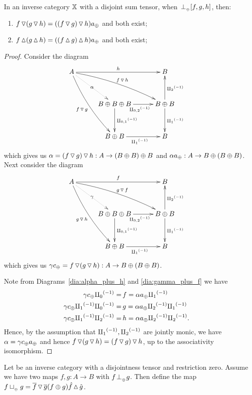 \begin{lemma}\label{lem:tjdown_and_tjup_associate}
  In an inverse category $\mathbb{X}$ with a disjoint sum tensor, when ${}_{{}_{}}{\perp_{{}_{\oplus}}} [f,g,h]$, then:
  \begin{enumerate}
    \item   $f \operatorname{\triangledown} (g \operatorname{\triangledown} h) = ((f \operatorname{\triangledown} g) \operatorname{\triangledown} h) a_{\oplus}$ and both exist;
    \item   $f \operatorname{\vartriangle} (g \operatorname{\vartriangle} h) = ((f \operatorname{\vartriangle} g) \operatorname{\vartriangle} h) a_{\oplus}$ and both exist;
  \end{enumerate}
\end{lemma}
\begin{proof}
  Consider the diagram
  \begin{equation}
    \xymatrix@C+5pt@R+10pt{
      A \ar@/_/[ddr]_{f\tjdown g} \ar@/^/[drr]^{f\tjdown h} \ar@{.>}[dr]|-{\alpha} \ar[rr]^{h}
        & & B \\
        & B\+B\+B \ar[d]^{\icp{0,1}} \ar[r]_{\icp{0,2}} & B\+B \ar[d]^{\icpa} \ar[u]_{\icpb} \\
        & B\+B \ar[r]_{\icpa} & B
    }\label{dia:alpha_plus_h}
  \end{equation}
  which gives us $\alpha = (f \operatorname{\triangledown} g) \operatorname{\triangledown} h: A \to (B\oplus B)\oplus B$ and
  $\alpha a_{\oplus} :A \to B\oplus(B\oplus B)$. Next consider the diagram
  \begin{equation}
    \xymatrix@C+5pt@R+10pt{
      A \ar@/_/[ddr]_{g\tjdown h} \ar@/^/[drr]^{g\tjdown f} \ar@{.>}[dr]|-{\gamma} \ar[rr]^{f}
        & & B \\
        & B\+B\+B \ar[d]^{\icp{0,1}} \ar[r]_{\icp{0,2}} & B\+B \ar[d]^{\icpa} \ar[u]_{\icpb} \\
        & B\+B \ar[r]_{\icpa} & B
    }\label{dia:gamma_plus_f}
  \end{equation}
  which gives us $\gamma c_{\oplus} = f \operatorname{\triangledown} (g\operatorname{\triangledown} h): A \to B\oplus(B\oplus B)$.

  Note from Diagrams~\ref{dia:alpha_plus_h} and \ref{dia:gamma_plus_f} we have
  \begin{align*}
    \gamma c_{\oplus}  {\amalg_{0}}^{(-1)}         =\, &f  = \alpha a_{\oplus}{\amalg_{1}}^{(-1)}\\
    \gamma c_{\oplus}  {\amalg_{1}}^{(-1)} {\amalg_{0}}^{(-1)} =\, &g  = \alpha a_{\oplus}{\amalg_{2}}^{(-1)}{\amalg_{1}}^{(-1)}\\
    \gamma c_{\oplus}  {\amalg_{1}}^{(-1)} {\amalg_{2}}^{(-1)}   =\, & h = \alpha a_{\oplus}{\amalg_{2}}^{(-1)}{\amalg_{2}}^{(-1)}.
  \end{align*}
  Hence, by the assumption that ${\amalg_{1}}^{(-1)}, {\amalg_{2}}^{(-1)}$ are jointly monic, we have
  $\alpha = \gamma c_{\oplus}  a_{\oplus}$ and hence $f \operatorname{\triangledown} (g \operatorname{\triangledown} h) = (f \operatorname{\triangledown} g) \operatorname{\triangledown} h$,
  up to the associativity isomorphism.
\end{proof}
\begin{definition}\label{def:tensor_disjoint_join}
  Let \X be an inverse category with a disjointness tensor and restriction zero. Assume we have two
  maps $f,g: A \to B$ with $f{}_{{}_{}}{\perp_{{}_{\oplus}}} g$. Then define the map $f \sqcup_{{_{\oplus}}} g = \overline{f}\operatorname{\triangledown}\overline{g}
  (f\oplus g) \hat{f}\operatorname{\vartriangle}\hat{g}$.
\end{definition}


